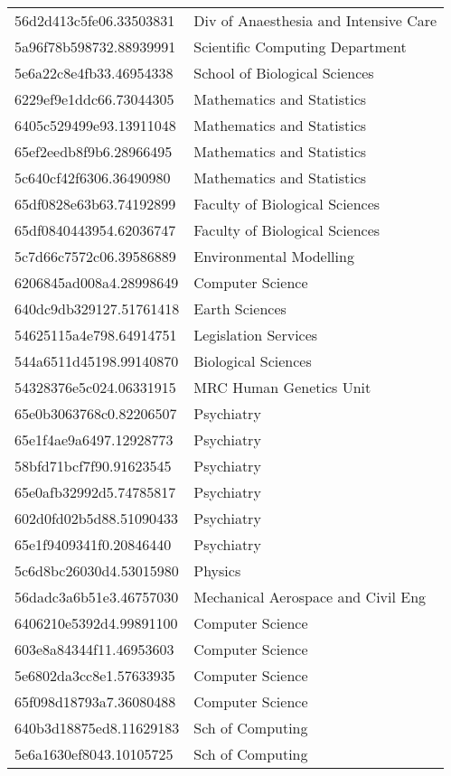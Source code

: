 \begin{tabular}{ll}
56d2d413c5fe06.33503831 & Div of Anaesthesia and Intensive Care \\
5a96f78b598732.88939991 & Scientific Computing Department \\
5e6a22c8e4fb33.46954338 & School of Biological Sciences \\
6229ef9e1ddc66.73044305 & Mathematics and Statistics \\
6405c529499e93.13911048 & Mathematics and Statistics \\
65ef2eedb8f9b6.28966495 & Mathematics and Statistics \\
5c640cf42f6306.36490980 & Mathematics and Statistics \\
65df0828e63b63.74192899 & Faculty of Biological Sciences \\
65df0840443954.62036747 & Faculty of Biological Sciences \\
5c7d66c7572c06.39586889 & Environmental Modelling \\
6206845ad008a4.28998649 & Computer Science \\
640dc9db329127.51761418 & Earth Sciences \\
54625115a4e798.64914751 & Legislation Services \\
544a6511d45198.99140870 & Biological Sciences \\
54328376e5c024.06331915 & MRC Human Genetics Unit \\
65e0b3063768c0.82206507 & Psychiatry \\
65e1f4ae9a6497.12928773 & Psychiatry \\
58bfd71bcf7f90.91623545 & Psychiatry \\
65e0afb32992d5.74785817 & Psychiatry \\
602d0fd02b5d88.51090433 & Psychiatry \\
65e1f9409341f0.20846440 & Psychiatry \\
5c6d8bc26030d4.53015980 & Physics \\
56dadc3a6b51e3.46757030 & Mechanical Aerospace and Civil Eng \\
6406210e5392d4.99891100 & Computer Science \\
603e8a84344f11.46953603 & Computer Science \\
5e6802da3cc8e1.57633935 & Computer Science \\
65f098d18793a7.36080488 & Computer Science \\
640b3d18875ed8.11629183 & Sch of Computing \\
5e6a1630ef8043.10105725 & Sch of Computing \\

\end{tabular}
